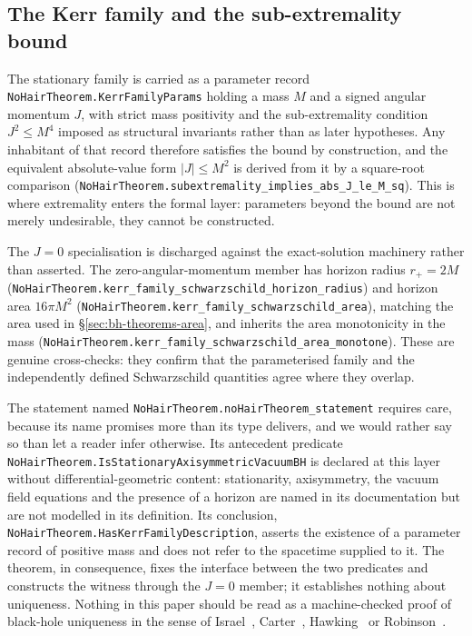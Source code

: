 \documentclass[aps,prd,nofootinbib,superscriptaddress,12pt]{revtex4-2}
\DeclareRobustCommand{\lb}{\discretionary{}{}{}}
\begin{document}
\subsection{The Kerr family and the sub-extremality bound}
\label{sec:bh-theorems-nohair}

The stationary family is carried as a parameter record
\texttt{No\lb{}Hair\lb{}Theorem.\lb{}Kerr\lb{}Family\lb{}Params} holding a mass $M$ and a signed angular
momentum $J$, with strict mass positivity and the sub-extremality condition
$J^2 \le M^4$ imposed as structural invariants rather than as later hypotheses.
Any inhabitant of that record therefore satisfies the bound by construction, and
the equivalent absolute-value form $|J| \le M^2$ is derived from it by a
square-root comparison (\texttt{No\lb{}Hair\lb{}Theorem.\lb{}subextremality\_\lb{}implies\_\lb{}abs\_\lb{}J\_\lb{}le\_\lb{}M\_\lb{}sq}).
This is where extremality enters the formal layer: parameters beyond the bound
are not merely undesirable, they cannot be constructed.

The $J = 0$ specialisation is discharged against the exact-solution machinery
rather than asserted. The zero-angular-momentum member has horizon radius
$r_+ = 2M$ (\texttt{No\lb{}Hair\lb{}Theorem.\lb{}kerr\_\lb{}family\_\lb{}schwarzschild\_\lb{}horizon\_\lb{}radius})
and horizon area $16\pi M^2$
(\texttt{No\lb{}Hair\lb{}Theorem.\lb{}kerr\_\lb{}family\_\lb{}schwarzschild\_\lb{}area}), matching the area used
in \S\ref{sec:bh-theorems-area}, and inherits the area monotonicity in the mass
(\texttt{No\lb{}Hair\lb{}Theorem.\lb{}kerr\_\lb{}family\_\lb{}schwarzschild\_\lb{}area\_\lb{}monotone}). These are
genuine cross-checks: they confirm that the parameterised family and the
independently defined Schwarzschild quantities agree where they overlap.

The statement named \texttt{No\lb{}Hair\lb{}Theorem.\lb{}no\lb{}Hair\lb{}Theorem\_\lb{}statement} requires care,
because its name promises more than its type delivers, and we would rather say so
than let a reader infer otherwise. Its antecedent predicate
\texttt{No\lb{}Hair\lb{}Theorem.\lb{}Is\lb{}Stationary\lb{}Axisymmetric\lb{}Vacuum\lb{}BH} is declared at this layer
without differential-geometric content: stationarity, axisymmetry, the vacuum
field equations and the presence of a horizon are named in its documentation but
are not modelled in its definition. Its conclusion,
\texttt{No\lb{}Hair\lb{}Theorem.\lb{}Has\lb{}Kerr\lb{}Family\lb{}Description}, asserts the existence of a
parameter record of positive mass and does not refer to the spacetime supplied to
it. The theorem, in consequence, fixes the interface between the two predicates
and constructs the witness through the $J = 0$ member; it establishes nothing
about uniqueness. Nothing in this paper should be read as a machine-checked proof
of black-hole uniqueness in the sense of Israel~\cite{Israel1967},
Carter~\cite{Carter1971}, Hawking~\cite{Hawking1972} or
Robinson~\cite{Robinson1975}.
\end{document}
